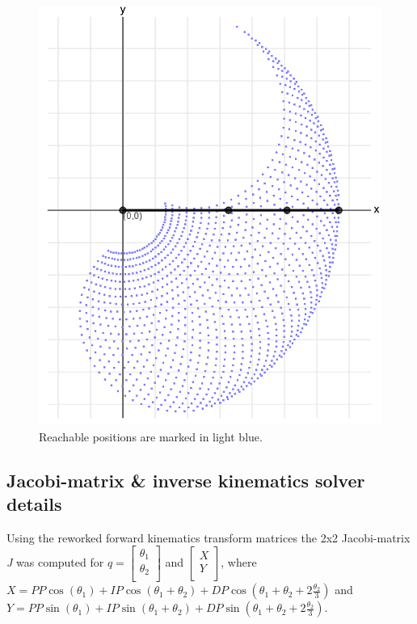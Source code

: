 \documentclass{article}
\begin{document}
\begin{figure}[h]
\centering
\includegraphics[scale=0.17]{reachable2.png}
\caption{Reachable positions are marked in light blue.}
\end{figure}
\newpage

\subsection{Jacobi-matrix \& inverse kinematics solver details}

Using the reworked forward kinematics transform matrices the 2x2 Jacobi-matrix \textit{J} was computed for  \(q = \begin{bmatrix}\theta_1\\\theta_2\\\end{bmatrix}\) and \(\begin{bmatrix}X\\Y\\\end{bmatrix}\), where \(X = PP\cos(\theta_1) + IP\cos(\theta_1 + \theta_2) + DP\cos(\theta_1 + \theta_2 +2\frac{\theta_2}{3})\) and \(Y = PP\sin(\theta_1) + IP\sin(\theta_1 + \theta_2) + DP\sin(\theta_1 + \theta_2 +2\frac{\theta_2}{3})\).\\
\end{document}

